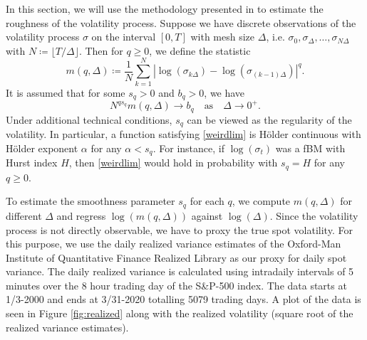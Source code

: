 In this section, we will use the methodology presented in \cite{volisrough} to estimate the roughness of the volatility process. Suppose we have discrete observations of the volatility process $\sigma$ on the interval $[0,T]$ with mesh size $\Delta$, i.e. $\sigma_{0},\sigma_{\Delta},\dots,\sigma_{N\Delta}$ with $N\coloneqq \lfloor T/\Delta\rfloor$. Then for $q\geq 0$, we define the statistic
\begin{equation}
    m(q,\Delta)\coloneqq \frac{1}{N}\sum_{k=1}^{N}|\log(\sigma_{k\Delta})-\log(\sigma_{(k-1)\Delta})|^{q}.
\end{equation}
It is assumed that for some $s_{q}>0$ and $b_{q}>0$, we have
\begin{equation}\label{weirdlim}
    N^{qs_{q}}m(q,\Delta)\to b_{q}\quad \textrm{as}\quad \Delta\to 0^{+}.
\end{equation}
Under additional technical conditions, $s_{q}$ can be viewed as the regularity of the volatility. In particular, a function satisfying \eqref{weirdlim} is Hölder continuous with Hölder exponent $\alpha$ for any $\alpha <s_{q}$. For instance, if $\log(\sigma_{t})$ was a fBM with Hurst index $H$, then \eqref{weirdlim} would hold in probability with $s_{q}=H$ for any $q\geq 0$.

To estimate the smoothness parameter $s_{q}$ for each $q$, we compute $m(q,\Delta)$ for different $\Delta$ and regress $\log(m(q,\Delta))$ against $\log(\Delta)$. Since the volatility process is not directly observable, we have to proxy the true spot volatility. For this purpose, we use the daily realized variance estimates of the Oxford-Man Institute of Quantitative Finance Realized Library as our proxy for daily spot variance. The daily realized variance is calculated using intradaily intervals of 5 minutes over the 8 hour trading day of the S\&P-500 index. The data starts at 1/3-2000 and ends at 3/31-2020 totalling 5079 trading days. A plot of the data is seen in Figure \ref{fig:realized} along with the realized volatility (square root of the realized variance estimates).

